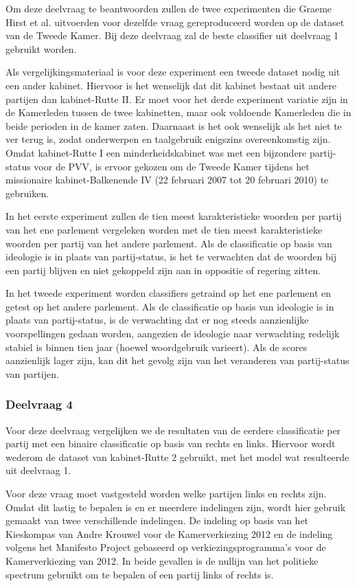 Om deze deelvraag te beantwoorden zullen de twee experimenten die Graeme Hirst et al. uitvoerden voor dezelfde vraag gereproduceerd worden op de dataset van de Tweede Kamer. Bij deze deelvraag zal de beste classifier uit deelvraag 1 gebruikt worden. \par
Als vergelijkingsmateriaal is voor deze experiment een tweede dataset nodig uit een ander kabinet. Hiervoor is het wenselijk dat dit kabinet bestaat uit andere partijen dan kabinet-Rutte II. Er moet voor het derde experiment variatie zijn in de Kamerleden tussen de twee kabinetten, maar ook voldoende Kamerleden die in beide perioden in de kamer zaten. Daarnaast is het ook wenselijk als het niet te ver terug is, zodat onderwerpen en taalgebruik enigszins overeenkomstig zijn. Omdat kabinet-Rutte I een minderheidskabinet was met een bijzondere partij-status voor de PVV, is ervoor gekozen om de Tweede Kamer tijdens het missionaire kabinet-Balkenende IV (22 februari 2007 tot 20 februari 2010) te gebruiken.\par
In het eerste experiment zullen de tien meest karakteristieke woorden per partij van het ene parlement vergeleken worden met de tien meest karakteristieke woorden per partij van het andere parlement. Als de classificatie op basis van ideologie is in plaats van partij-status, is het te verwachten dat de woorden bij een partij blijven en niet gekoppeld zijn aan in oppositie of regering zitten. \par
In het tweede experiment worden classifiers getraind op het ene parlement en getest op het andere parlement. Als de classificatie op basis van ideologie is in plaats van partij-status, is de verwachting dat er nog steeds aanzienlijke voorspellingen gedaan worden, aangezien de ideologie naar verwachting redelijk stabiel is binnen tien jaar (hoewel woordgebruik varieert). Als de scores aanzienlijk lager zijn, kan dit het gevolg zijn van het veranderen van partij-status van partijen.\par

\subsubsection{Deelvraag 4}
Voor deze deelvraag vergelijken we de resultaten van de eerdere classificatie per partij met een binaire classificatie op basis van rechts en links. Hiervoor wordt wederom de dataset van kabinet-Rutte 2 gebruikt, met het model wat resulteerde uit deelvraag 1. \par
Voor deze vraag moet vastgesteld worden welke partijen links en rechts zijn. Omdat dit lastig te bepalen is en er meerdere indelingen zijn, wordt hier gebruik gemaakt van twee verschillende indelingen. De indeling op basis van het Kieskompas van Andre Krouwel voor de Kamerverkiezing 2012 en de indeling volgens het Manifesto Project gebaseerd op verkiezingsprogramma's voor de Kamerverkiezing van 2012\cite{Volkens:2017}. In beide gevallen is de nullijn van het politieke spectrum gebruikt om te bepalen of een partij links of rechts is.\par

